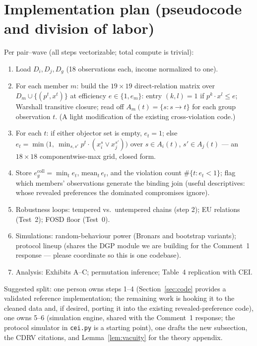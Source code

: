 \documentclass[11pt]{article}
\theoremstyle{remark}
\begin{document}
\section{Implementation plan (pseudocode and division of labor)}\label{sec:implementation}

Per pair--wave (all steps vectorizable; total compute is trivial):
\begin{enumerate}[leftmargin=1.6em]
\item Load $D_i,D_j,D_g$ (18 observations each, income normalized to one).
\item For each member $m$: build the $19\times 19$ direct-relation matrix over $D_m\cup\{(p^t,x^t)\}$ at efficiency $e\in\{1,e_m\}$: entry $(k,l)=1$ if $p^k\cdot x^l\le e$; Warshall transitive closure; read off $A_m(t)=\{s: s\to t\}$ for each group observation $t$. (A light modification of the existing cross-violation code.)
\item For each $t$: if either objector set is empty, $e_t=1$; else $e_t=\min\bigl(1,\ \min_{s,s'} p^t\cdot(x^s_i\vee x^{s'}_j)\bigr)$ over $s\in A_i(t)$, $s'\in A_j(t)$ --- an $18\times 18$ componentwise-max grid, closed form.
\item Store $e^{\mathrm{coll}}_g=\min_t e_t$, $\mathrm{mean}_t\, e_t$, and the violation count $\#\{t: e_t<1\}$; flag which members' observations generate the binding join (useful descriptives: whose revealed preferences the dominated compromises ignore).
\item Robustness loops: tempered vs.\ untempered chains (step 2); \citet{polisson2020} EU relations (Test~2); FOSD floor (Test~0).
\item Simulations: random-behaviour power (Bronars and bootstrap variants); protocol lineup (shares the DGP module we are building for the Comment~1 response --- please coordinate so this is one codebase).
\item Analysis: Exhibits A--C; permutation inference; Table~4 replication with CEI.
\end{enumerate}

Suggested split: one person owns steps 1--4 (Section~\ref{sec:code} provides a validated reference implementation; the remaining work is hooking it to the cleaned data and, if desired, porting it into the existing revealed-preference code), one owns 5--6 (simulation engine, shared with the Comment~1 response; the protocol simulator in \texttt{cei.py} is a starting point), one drafts the new subsection, the CDRV citations, and Lemma~\ref{lem:vacuity} for the theory appendix.
\end{document}

